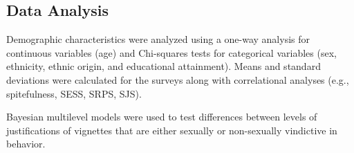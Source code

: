 \documentclass[
  donotrepeattitle,doc, 12pt, a4paper,floatsintext]{apa7}
\begin{document}
\hypertarget{data-analysis-1}{%
\subsection{Data Analysis}\label{data-analysis-1}}

Demographic characteristics were analyzed using a one-way analysis for continuous variables (age) and Chi-squares tests for categorical variables (sex, ethnicity, ethnic origin, and educational attainment). Means and standard deviations were calculated for the surveys along with correlational analyses (e.g., spitefulness, SESS, SRPS, SJS).

Bayesian multilevel models were used to test differences between levels of justifications of vignettes that are either sexually or non-sexually vindictive in behavior.
\end{document}
